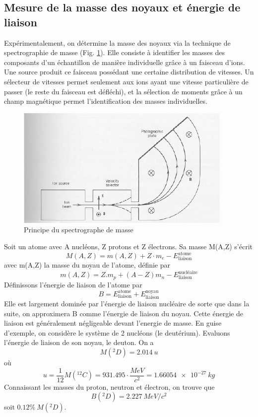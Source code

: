 \subsection{Mesure de la masse des noyaux et énergie de liaison}
Expérimentalement, on détermine la masse des noyaux via la technique de spectrographie de masse (Fig. \ref{fig:spectro_masse}). Elle consiste à identifier les masses des composants d'un échantillon de manière individuelle grâce à un faisceau d'ions. Une source produit ce faisceau possédant une certaine distribution de vitesses. Un sélecteur de vitesses permet seulement aux ions ayant une vitesse particulière de passer (le reste du faisceau est défléchi), et la sélection de moments grâce à un champ magnétique permet l'identification des masses individuelles.
\begin{figure}[ht]
    \centering
    \includegraphics[scale=0.80]{Images1/spectro.PNG}
    \caption{Principe du spectrographe de masse}
    \label{fig:spectro_masse}
\end{figure}
Soit un atome avec A nucléons, Z protons et Z électrons. Sa masse M(A,Z) s'écrit
\[
    M(A,Z) = m(A,Z) + Z \cdot m_e - E^{\text{atome}}_{\text{liaison}}
\]
avec m(A,Z) la masse du noyau de l'atome, définie par
\[
m(A,Z)=Z.m_p+(A-Z)m_n-E^{\text{nucléaire}}_{\text{liaison}}
\]
Définissons l'énergie de liaison de l'atome par
\[
    B=E^\text{atome}_\text{liaison}+E^{\text{noyau}}_{\text{liaison}}
\]
Elle est largement dominée par l'énergie de liaison nucléaire de sorte que dans la suite, on approximera B comme l'énergie de liaison du noyau. Cette énergie de liaison est généralement négligeable devant l'energie de masse.
En guise d'exemple, on considère le système de 2 nucléons (le deutérium). Evaluons l'énergie de liaison de son noyau, le deuton. On a
\[
    M(^{2}_{}D)=2.014~u
\]
où \[u=\dfrac{1}{12}M(^{12}_{}C)=931.495 \cdot \dfrac{\si{MeV}}{c^2}=\SI{1.66054e-27}{kg}\]
Connaissant les masses du proton, neutron et électron, on trouve que
\[
    B(^{2}_{}D) = \SI{2.227}{MeV}/c^2
\]
soit $0.12\%~M(^{2}_{}D)$.

